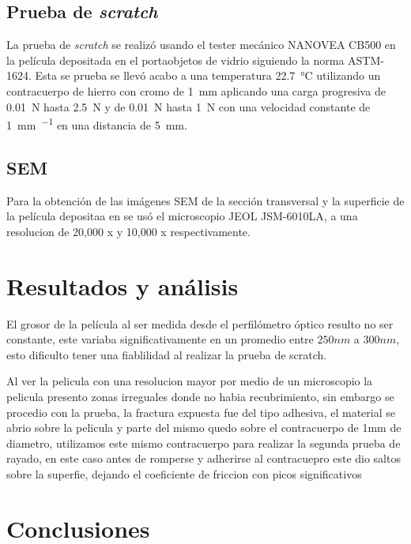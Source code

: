 \documentclass[12pt]{IEEEtran}
\begin{document}
\subsection{Prueba de \emph{scratch}}

La prueba de \emph{scratch} se realizó usando el tester mecánico NANOVEA CB500 en la película depositada en el portaobjetos de vidrio siguiendo la norma ASTM-1624. Esta se prueba se llevó acabo a una temperatura \qty{22.7}{\degreeCelsius} utilizando un contracuerpo de hierro con cromo de \qty{1}{\mm} aplicando una carga progresiva de \qty{0.01}{\N} hasta \qty{2.5}{\N} y de \qty{0.01}{\N} hasta \qty{1}{\N} con una velocidad constante de \qty{1}{\mm\per\min} en una distancia de \qty{5}{\mm}.

\subsection{SEM}

Para la obtención de las imágenes SEM de la sección transversal y la superficie de la película depositaa en  se usó el microscopio JEOL JSM-6010LA, a una resolucion de 20,000 x y 10,000 x respectivamente.

\section{Resultados y análisis}

El grosor de la película al ser medida desde el perfilómetro óptico resulto no ser constante, este variaba significativamente en un promedio entre $250 nm$ a $300 nm$, esto dificulto tener una fiablilidad al realizar la prueba de scratch.

Al ver la pelicula con una resolucion mayor por medio de un microscopio la pelicula presento zonas irreguales donde no habia recubrimiento, sin embargo se procedio con la prueba, la fractura expuesta fue del tipo adhesiva, el material se abrio sobre la pelicula y parte del mismo quedo sobre el contracuerpo de 1mm de diametro, utilizamos este mismo contracuerpo para realizar la segunda prueba de rayado, en este caso antes de romperse y adherirse al contracuepro este dio saltos sobre la superfie, dejando el coeficiente de friccion con picos significativos

\section{Conclusiones}
\kant[5]


\nocite{*}
\printbibliography
\end{document}
